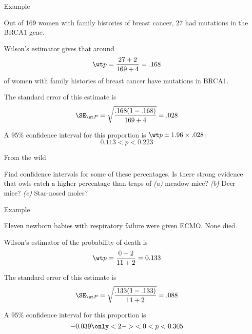 \begin{frame}{Example}

    Out of 169 women with family histories of breast cancer, 27 had mutations in the BRCA1 gene.

    \vspace{2em}

    \alert{Wilson's estimator} gives that around
        \[ \wt p = \frac{27 + 2}{169+4} = .168 \]
    of women with family histories of breast cancer have mutations in BRCA1.

    \vspace{2em}

    The \alert{standard error} of this estimate is
    \[ \SE_{\wt P} = \sqrt{\frac{.168(1-.168)}{169+4}} = .028  \]

    \vspace{2em}

    A \alert{95\% confidence interval} for this proportion is $\wt p \pm 1.96 \times .028$:
    \[ 0.113 < p < 0.223 \]

\end{frame}

\begin{frame}{From the wild}

    \begin{center}
    \end{center}

    \vspace{2em}

    Find confidence intervals for some of these percentages.  
    Is there strong evidence that owls catch a higher percentage than traps of 
    \textit{(a)} meadow mice?
    \textit{(b)} Deer mice?
    \textit{(c)} Star-nosed moles?


\end{frame}

\begin{frame}{Example}

    Eleven newborn babies with respiratory failure were given ECMO.  None died.

    \vspace{2em}

    \alert{Wilson's estimator} of the probability of death is
    \[ \wt p = \frac{0+2}{11+2} = 0.133 \]

    \vspace{2em}

    The \alert{standard error} of this estimate is
    \[ \SE_{\wt P} = \sqrt{\frac{ .133(1-.133) }{ 11+2 }} = .088 \]

    \vspace{2em}

    A \alert{95\% confidence interval} for this proportion is
        \[ -0.039 \only<2->{ < 0 }< p < 0.305 \]


\end{frame}


